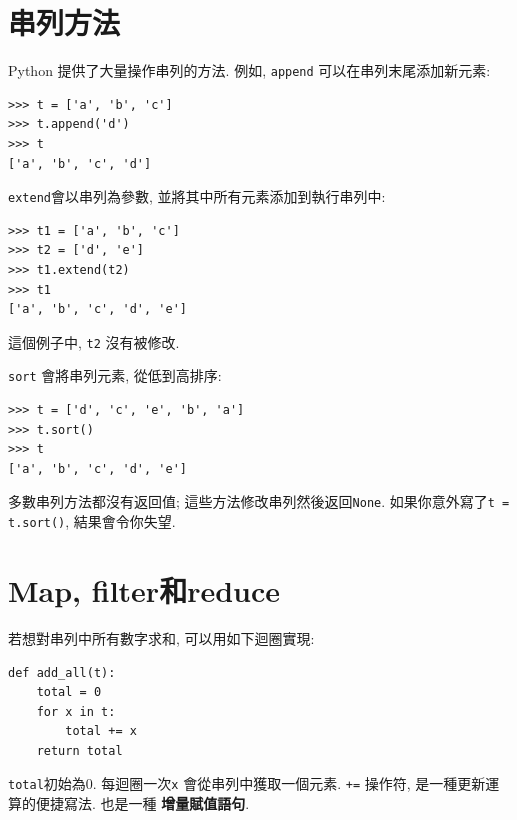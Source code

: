 \documentclass[10pt]{book}
\begin{document}
%


\section{串列方法}

Python 提供了大量操作串列的方法. 例如, 
{\tt append} 可以在串列末尾添加新元素:

\begin{verbatim}
>>> t = ['a', 'b', 'c']
>>> t.append('d')
>>> t
['a', 'b', 'c', 'd']
\end{verbatim}
%
{\tt extend}會以串列為參數, 並將其中所有元素添加到執行串列中:

\begin{verbatim}
>>> t1 = ['a', 'b', 'c']
>>> t2 = ['d', 'e']
>>> t1.extend(t2)
>>> t1
['a', 'b', 'c', 'd', 'e']
\end{verbatim}
%
這個例子中, {\tt t2} 沒有被修改. 

{\tt sort} 會將串列元素, 從低到高排序:

\begin{verbatim}
>>> t = ['d', 'c', 'e', 'b', 'a']
>>> t.sort()
>>> t
['a', 'b', 'c', 'd', 'e']
\end{verbatim}
%
多數串列方法都沒有返回值; 這些方法修改串列然後返回{\tt None}. 
如果你意外寫了{\tt t = t.sort()}, 結果會令你失望. 


\section{Map, filter和reduce}
\label{filter}

若想對串列中所有數字求和, 可以用如下迴圈實現:


\begin{verbatim}
def add_all(t):
    total = 0
    for x in t:
        total += x
    return total
\end{verbatim}
%
{\tt total}初始為0.
每迴圈一次{\tt x} 會從串列中獲取一個元素. {\tt +=} 操作符, 是一種更新運算的便捷寫法. 
也是一種 {\bf 增量賦值語句}. 
\end{document}
